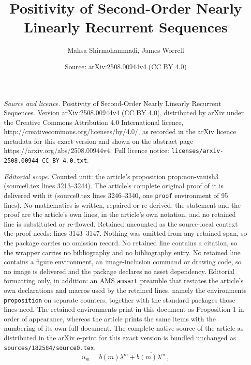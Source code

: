 \documentclass[10pt,a4paper]{amsart}
\title{Positivity of Second-Order Nearly Linearly Recurrent Sequences}
\author{Mahsa Shirmohammadi, James Worrell}
\date{Source: arXiv:2508.00944v4 (CC BY 4.0)}
\begin{document}
\maketitle

\noindent\emph{Source and licence.} Positivity of Second-Order Nearly Linearly Recurrent Sequences. Version arXiv:2508.00944v4 (CC BY 4.0), distributed by arXiv under the Creative Commons Attribution 4.0 International licence, http://creativecommons.org/licenses/by/4.0/, as recorded in the arXiv licence metadata for this exact version and shown on the abstract page https://arxiv.org/abs/2508.00944v4. Full licence notice: \texttt{licenses/arxiv-2508.00944-CC-BY-4.0.txt}.\par\smallskip

\noindent\textit{Editorial scope.} Counted unit: the article's proposition prop:non-vanish3 (source0.tex lines 3213--3244). The article's complete original proof of it is delivered with it (source0.tex lines 3246--3340, one \texttt{proof} environment of 95 lines). No mathematics is written, repaired or re-derived: the statement and the proof are the article's own lines, in the article's own notation, and no retained line is substituted or re-flowed.  Retained uncounted as the source-local context the proof needs: lines 3143--3147.  Nothing was omitted from any retained span, so the package carries no omission record.  No retained line contains a citation, so the wrapper carries no bibliography and no bibliography entry.  No retained line contains a figure environment, an image-inclusion command or drawing code, so no image is delivered and the package declares no asset dependency.  Editorial formatting only, in addition: an AMS \texttt{amsart} preamble that restates the article's own declarations and macros used by the retained lines, namely the environments \texttt{proposition} on separate counters, together with the standard packages those lines need.  The retained environments print in this document as Proposition 1 in order of appearance, whereas the article prints the same items with the numbering of its own full document.  The complete native source of the article as distributed in the arXiv e-print for this exact version is bundled unchanged as \texttt{sources/182584/source0.tex}.
\begin{equation}
    u_m
    = b(m)\lambda^m + \overline{b(m)\lambda^m} \, ,
    \label{eq:closed-form-repeated}
\end{equation}
\end{document}
